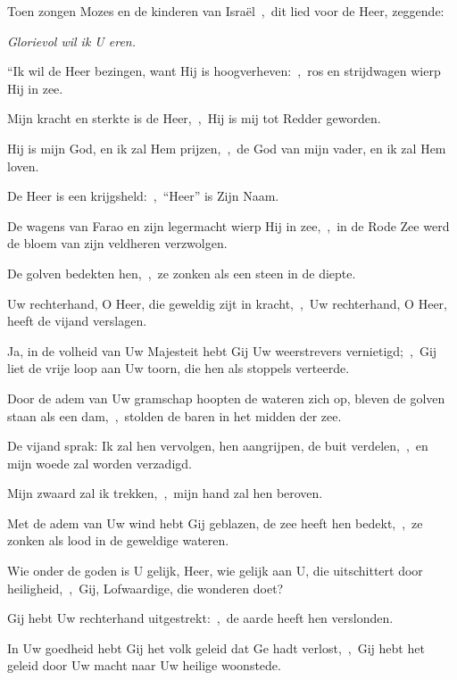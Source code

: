 \documentclass[12pt,twoside,a5paper]{article}
\begin{document}
\begin{halfparskip}
  Toen zongen Mozes en de kinderen van Israël~\sep\ dit lied voor de Heer, zeggende:


   \emph{Glorievol wil ik U eren.}

  ``Ik wil de Heer bezingen, want Hij is hoogverheven:~\sep\ ros en strijdwagen wierp Hij in zee.

  Mijn kracht en sterkte is de Heer,~\sep\ Hij is mij tot Redder geworden.

  Hij is mijn God, en ik zal Hem prijzen,~\sep\ de God van mijn vader, en ik zal Hem loven.

  De Heer is een krijgsheld:~\sep\ ``Heer'' is Zijn Naam.

  De wagens van Farao en zijn legermacht wierp Hij in zee,~\sep\ in de Rode Zee werd de bloem van zijn veldheren verzwolgen.

  De golven bedekten hen,~\sep\ ze zonken als een steen in de diepte.

  Uw rechterhand, O Heer, die geweldig zijt in kracht,~\sep\ Uw rechterhand, O Heer, heeft de vijand verslagen.

  Ja, in de volheid van Uw Majesteit hebt Gij Uw weerstrevers vernietigd;~\sep\ Gij liet de vrije loop aan Uw toorn, die hen als stoppels verteerde.

  Door de adem van Uw gramschap hoopten de wateren zich op, bleven de golven staan als een dam,~\sep\ stolden de baren in het midden der zee.

  De vijand sprak: Ik zal hen vervolgen, hen aangrijpen, de buit verdelen,~\sep\ en mijn woede zal worden verzadigd.

  Mijn zwaard zal ik trekken,~\sep\ mijn hand zal hen beroven.

  Met de adem van Uw wind hebt Gij geblazen, de zee heeft hen bedekt,~\sep\ ze zonken als lood in de geweldige wateren.

  Wie onder de goden is U gelijk, Heer, wie gelijk aan U, die uitschittert door heiligheid,~\sep\ Gij, Lofwaardige, die wonderen doet?

  Gij hebt Uw rechterhand uitgestrekt:~\sep\ de aarde heeft hen verslonden.

  In Uw goedheid hebt Gij het volk geleid dat Ge hadt verlost,~\sep\ Gij hebt het geleid door Uw macht naar Uw heilige woonstede.


\end{halfparskip}
\end{document}
